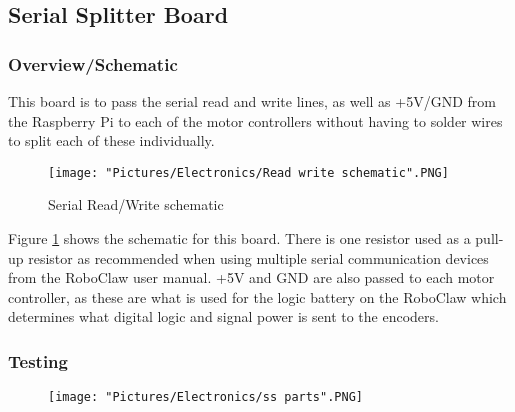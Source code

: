 \documentclass[12pt]{article}
\begin{document}
\subsection{Serial Splitter Board}


\subsubsection{Overview/Schematic}

This board is to pass the serial read and write lines, as well as +5V/GND from the Raspberry Pi to each of the motor controllers without having to solder wires to split each of these individually. 

\begin{figure}[H]
  	\centering
    	\texttt{[image: "Pictures/Electronics/Read write schematic".PNG]}
 	\caption{Serial Read/Write schematic}
	\label{rw sch}
\end{figure}

Figure \ref{rw sch} shows the schematic for this board. There is one resistor used as a pull-up resistor as recommended when using multiple serial communication devices from the RoboClaw user manual. +5V and GND are also passed to each motor controller, as these are what is used for the logic battery on the RoboClaw which determines what digital logic and signal power is sent to the encoders. 

\subsubsection{Testing}

\begin{figure}[H]
  	\centering
    	\texttt{[image: "Pictures/Electronics/ss parts".PNG]}
\end{figure}
\end{document}
